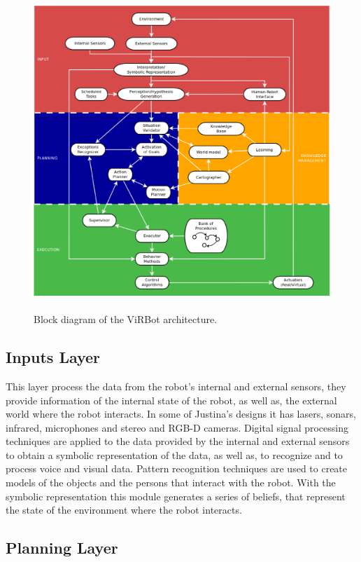 \documentclass{llncs}
\begin{document}
\begin{figure}[h]
	\centering
	\includegraphics[angle=0, height=12cm, width=12cm]{Figures/ViRBot.eps}
	\caption{Block diagram of the ViRBot architecture.}
	\label{fig:virbot}
\end{figure}


\subsection{Inputs Layer}

This layer process the data from the robot's internal and external sensors, 
they provide information of the internal state of the robot, as well as, the external world where the robot interacts.
In some of Justina's designs it has lasers, sonars, infrared, microphones and stereo and RGB-D cameras.
Digital signal processing techniques are applied to the data provided by the internal and external sensors to
obtain a symbolic representation of the data, as well as, to recognize and to process voice and visual data.
Pattern recognition techniques are used to create models of the objects and the persons that interact with the robot.
With the symbolic representation this module generates a series of beliefs, that represent the state of the environment where
the robot interacts.


\subsection{Planning Layer}
\end{document}
